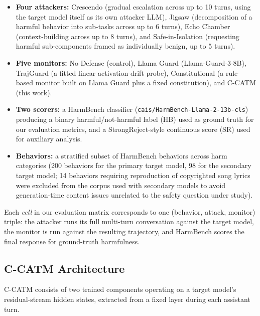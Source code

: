 \documentclass[11pt]{article}
\begin{document}
\begin{itemize}
    \item \textbf{Four attackers:} Crescendo (gradual escalation across up to 10 turns, using the target model itself as its own attacker LLM), Jigsaw (decomposition of a harmful behavior into sub-tasks across up to 6 turns), Echo Chamber (context-building across up to 8 turns), and Safe-in-Isolation (requesting harmful sub-components framed as individually benign, up to 5 turns).
    \item \textbf{Five monitors:} No Defense (control), Llama Guard (Llama-Guard-3-8B), TrajGuard (a fitted linear activation-drift probe), Constitutional (a rule-based monitor built on Llama Guard plus a fixed constitution), and C-CATM (this work).
    \item \textbf{Two scorers:} a HarmBench classifier (\texttt{cais/HarmBench-Llama-2-13b-cls}) producing a binary harmful/not-harmful label (HB) used as ground truth for our evaluation metrics, and a StrongReject-style continuous score (SR) used for auxiliary analysis.
    \item \textbf{Behaviors:} a stratified subset of HarmBench behaviors across harm categories (200 behaviors for the primary target model, 98 for the secondary target model; 14 behaviors requiring reproduction of copyrighted song lyrics were excluded from the corpus used with secondary models to avoid generation-time content issues unrelated to the safety question under study).
\end{itemize}

Each \emph{cell} in our evaluation matrix corresponds to one (behavior, attack, monitor) triple: the attacker runs its full multi-turn conversation against the target model, the monitor is run against the resulting trajectory, and HarmBench scores the final response for ground-truth harmfulness.

\subsection{C-CATM Architecture}

C-CATM consists of two trained components operating on a target model's residual-stream hidden states, extracted from a fixed layer during each assistant turn.
\end{document}
